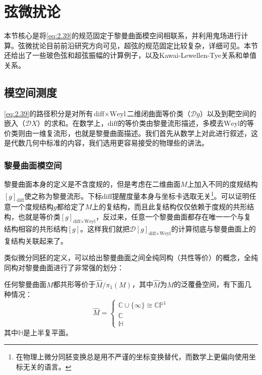 \chapter{弦微扰论}
\label{chap:4}
本节核心是将\ref{eq:2.39}的规范固定于黎曼曲面模空间相联系，并利用鬼场进行计算。弦微扰论目前前沿研究方向可见\cite{berkovits2022snowmasswhitepaperstring}，超弦的规范固定比较复杂，详细可见\cite{Witten:2012bh}。本节还给出了一些玻色弦和超弦振幅的计算例子，以及Kawai-Lewellen-Tye关系\cite{Kawai:1985xq}和单值关系\cite{Bjerrum-Bohr:2009ulz}。

\section{模空间测度}
\ref{eq:2.39}的路径积分是对所有$\text{diff}\times\text{Weyl}$二维闭曲面等价类（$\mathcal{D}g$）以及到靶空间的嵌入（$\mathcal{D}X$）的求和。在数学上，$\text{diff}$的等价类由黎曼流形描述，多模去$\text{Weyl}$的等价类则由一维复流形，也就是黎曼曲面描述。我们首先从数学上对此进行叙述，这是代数几何中标准的内容\cite{forster2012lectures,schlichenmaier2010introduction,griffiths2014principles}，我们选用更容易接受的物理些的讲法\cite{Giacchetto:2024aka,Staessens:2010vi}。
\subsection{黎曼曲面模空间}
黎曼曲面本身的定义是不含度规的，但是考虑在二维曲面$M$上加入不同的度规结构$[g]_{\text{diff}}$使之称为黎曼流形。下标$\text{diff}$提醒度量本身与坐标卡选取无关\footnote{在物理上微分同胚变换总是用不严谨的坐标变换替代，而数学上更偏向使用坐标无关的语言。}。可以证明任意一个度规结构$g$都给定了$M$上的复结构，而且此复结构仅仅依赖于度规的共形结构，也就是等价类$[g]_{\text{diff}\times\text{Weyl}}$，反过来，任意一个黎曼曲面都存在唯一一个与复结构相容的共形结构$[g]$。这样我们就把${\mathcal{D}[g]_{\text{diff}\times\text{Weyl}}}$的计算彻底与黎曼曲面上的复结构关联起来了。

类似微分同胚的定义，可以给出黎曼曲面之间全纯同构（共性等价）的概念，全纯同构对黎曼曲面进行了非常强的划分：

\begin{boxedtext}[单值化定理]
任何黎曼曲面$M$都共形等价于$\hat{M}/\pi_1(M)$，其中$\hat{M}$为$M$的泛覆叠空间，有下面几种情况：
\begin{equation*}
	\hat{M}=\left\{\begin{array}{c}\mathbb{C}\cup\{\infty\}\cong\mathbb{CP}^1\\\mathbb{C}\\\mathbb{H}\end{array}\right.
\end{equation*}
其中$\mathbb{H}$是上半复平面。
\end{boxedtext}

